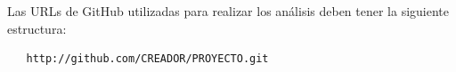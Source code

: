 \documentclass[a4paper, 12pt]{book}
\begin{document}
Las URLs de GitHub utilizadas para realizar los análisis deben tener la siguiente estructura:
{\footnotesize
\begin{verbatim}
   http://github.com/CREADOR/PROYECTO.git
\end{verbatim}
}


\cleardoublepage


\end{document}
